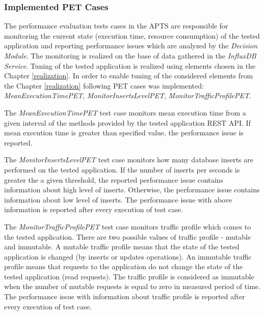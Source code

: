 \documentclass[12pt,a4paper]{article}
\begin{document}
\subsubsection{Implemented PET Cases} \label{dm}

 The performance evaluation tests cases in the APTS are responsible for monitoring the current state (execution time, resource consumption) of the tested application and reporting performance issues which are analyzed by the \textit{Decision Module}. The monitoring is realized on the base of data gathered in the \textit{InfluxDB Service}.  Tuning of the tested application is realized using elements chosen in the Chapter \ref{realization}. In order to enable tuning of the considered elements from the Chapter \ref{realization} following PET cases was implemented: \textit{MeanExecutionTimePET}, \textit{MonitorInsertsLevelPET},  \textit{MonitorTrafficProfilePET}.
 
 The \textit{MeanExecutionTimePET} test case monitors mean execution time from a given interval of the methods provided by the tested application REST API. If mean execution time is greater than specified value, the performance issue is reported. 

The \textit{MonitorInsertsLevelPET} test case monitors how many database inserts are performed on the tested application. If the number of inserts per seconds is greater the a given threshold, the reported performance issue contains information about high level of inserts. Otherwise, the performance issue contains information about low level of inserts. The performance issue with above information is reported after every execution of test case. 

The \textit{MonitorTrafficProfilePET} test case monitors traffic profile which comes to the tested application. There are two possible values of traffic profile - mutable and immutable. A mutable traffic profile means that the state of the tested application is changed (by inserts or updates operations). An immutable traffic profile means that requests to the application do not change the state of the tested application (read requests). The traffic profile is considered as immutable when the number of mutable requests is equal to zero in measured period of time. The performance issue with information about traffic profile is reported after every execution of test case.
\end{document}
